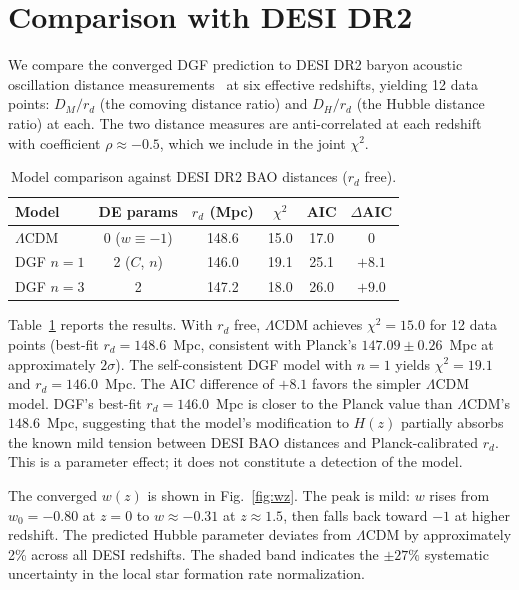 \documentclass[12pt,a4paper]{article}
\begin{document}
\section*{Comparison with DESI DR2}

We compare the converged DGF prediction to DESI DR2 baryon acoustic oscillation distance measurements~\cite{desi2025} at six effective redshifts, yielding 12 data points: $D_M/r_d$ (the comoving distance ratio) and $D_H/r_d$ (the Hubble distance ratio) at each. The two distance measures are anti-correlated at each redshift with coefficient $\rho\approx-0.5$, which we include in the joint $\chi^2$.

\begin{table}[htbp]
\centering
\caption{Model comparison against DESI DR2 BAO distances ($r_d$ free).}
\label{tab:models}
\begin{tabular}{lccccc}
\toprule
Model & DE params & $r_d$ (Mpc) & $\chi^2$ & AIC & $\Delta$AIC \\
\midrule
$\Lambda$CDM     & 0 ($w\equiv-1$)   & 148.6 & 15.0 & 17.0 & 0 \\
DGF $n=1$       & 2 ($C$, $n$)      & 146.0 & 19.1 & 25.1 & $+8.1$ \\
DGF $n=3$       & 2                  & 147.2 & 18.0 & 26.0 & $+9.0$ \\
\bottomrule
\end{tabular}
\end{table}

Table~\ref{tab:models} reports the results. With $r_d$ free, $\Lambda$CDM achieves $\chi^2=15.0$ for 12 data points (best-fit $r_d=148.6$~Mpc, consistent with Planck's $147.09\pm0.26$~Mpc at approximately $2\sigma$). The self-consistent DGF model with $n=1$ yields $\chi^2=19.1$ and $r_d=146.0$~Mpc. The AIC difference of $+8.1$ favors the simpler $\Lambda$CDM model. DGF's best-fit $r_d=146.0$~Mpc is closer to the Planck value than $\Lambda$CDM's $148.6$~Mpc, suggesting that the model's modification to $H(z)$ partially absorbs the known mild tension between DESI BAO distances and Planck-calibrated $r_d$. This is a parameter effect; it does not constitute a detection of the model.

The converged $w(z)$ is shown in Fig.~\ref{fig:wz}. The peak is mild: $w$ rises from $w_0=-0.80$ at $z=0$ to $w\approx-0.31$ at $z\approx1.5$, then falls back toward $-1$ at higher redshift. The predicted Hubble parameter deviates from $\Lambda$CDM by approximately 2\% across all DESI redshifts. The shaded band indicates the $\pm27\%$ systematic uncertainty in the local star formation rate normalization.
\end{document}

